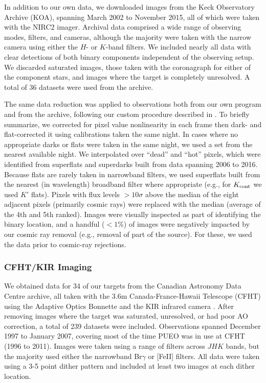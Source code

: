 \documentclass[twocolumn]{aastex62}
\begin{document}
In addition to our own data, we downloaded images from the Keck Observatory Archive (KOA), spanning March 2002 to November 2015, all of which were taken with the NIRC2 imager. Archival data comprised a wide range of observing modes, filters, and cameras, although the majority were taken with the narrow camera using either the $H$- or $K$-band filters. We included nearly all data with clear detections of both binary components independent of the observing setup. We discarded saturated images, those taken with the coronagraph for either of the component stars, and images where the target is completely unresolved. A total of 36 datasets were used from the archive. 

The same data reduction was applied to observations both from our own program and from the archive, following our custom procedure described in \citet{Kraus2016a}. To briefly summarize, we corrected for pixel value nonlinearity in each frame then dark- and flat-corrected it using calibrations taken the same night. In cases where no appropriate darks or flats were taken in the same night, we used a set from the nearest available night. We interpolated over ``dead'' and ``hot'' pixels, which were identified from superflats and superdarks built from data spanning 2006 to 2016. Because flats are rarely taken in narrowband filters, we used superflats built from the nearest (in wavelength) broadband filter where appropriate (e.g., for $K_{\rm{cont}}$ we used $K'$ flats). Pixels with flux levels $>10\sigma$ above the median of the eight adjacent pixels (primarily cosmic rays) were replaced with the median (average of the 4th and 5th ranked). Images were visually inspected as part of identifying the binary location, and a handful ($<1\%$) of images were negatively impacted by our cosmic ray removal (e.g., removal of part of the source). For these, we used the data prior to cosmic-ray rejections.

\subsubsection{CFHT/KIR Imaging}

We obtained data for 34 of our targets from the Canadian Astronomy Data Centre archive, all taken with the 3.6m Canada-France-Hawaii Telescope (CFHT) using the Adaptive Optics Bonnette \citep[AOB, often referred to as PUEO after the Hawaiian owl,][]{1994SPIE.2201..833A} and the KIR infrared camera \citep{1998SPIE.3354..760D}. After removing images where the target was saturated, unresolved, or had poor AO correction, a total of 239 datasets were included. Observations spanned December 1997 to January 2007, covering most of the time PUEO was in use at CFHT (1996 to 2011). Images were taken using a range of filters across $JHK$ bands, but the majority used either the narrowband Br$\gamma$ or [FeII] filters. All data were taken using a 3-5 point dither pattern and included at least two images at each dither location. 
\end{document}

